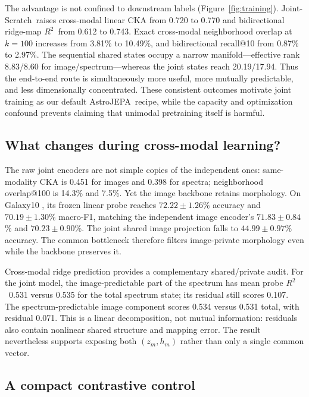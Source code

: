 \documentclass{article}
\newcommand{\method}{AstroJEPA}
\newcommand{\joint}{Joint-Scratch}
\newcommand{\rscore}{$R^2$}
\begin{document}
The advantage is not confined to downstream labels
(Figure~\ref{fig:training}).
\joint\ raises cross-modal linear CKA from 0.720 to 0.770 and bidirectional
ridge-map \rscore\ from 0.612 to 0.743.
Exact cross-modal neighborhood overlap at $k=100$ increases from 3.81\% to
10.49\%, and bidirectional recall@10 from 0.87\% to 2.97\%.
The sequential shared states occupy a narrow manifold---effective rank
8.83/8.60 for image/spectrum---whereas the joint states reach 20.19/17.94.
Thus the end-to-end route is simultaneously more useful, more mutually
predictable, and less dimensionally concentrated.
These consistent outcomes motivate joint training as our default \method\
recipe, while the capacity and optimization confound prevents claiming that
unimodal pretraining itself is harmful.

\subsection{What changes during cross-modal learning?}
\label{sec:change}

The raw joint encoders are not simple copies of the independent ones:
same-modality CKA is 0.451 for images and 0.398 for spectra; neighborhood
overlap@100 is 14.3\% and 7.5\%.
Yet the image backbone retains morphology.
On Galaxy10 \citep{leung2024galaxy10}, its frozen linear probe reaches
$72.22\pm1.26$\% accuracy and $70.19\pm1.30$\% macro-F1, matching the
independent image encoder's $71.83\pm0.84$\% and
$70.23\pm0.90$\%.
The joint shared image projection falls to
$44.99\pm0.97$\% accuracy.
The common bottleneck therefore filters image-private morphology even while
the backbone preserves it.

Cross-modal ridge prediction provides a complementary shared/private audit.
For the joint model, the image-predictable part of the spectrum has mean probe
\rscore\ 0.531 versus 0.535 for the total spectrum state; its residual still
scores 0.107.
The spectrum-predictable image component scores 0.534 versus 0.531 total,
with residual 0.071.
This is a linear decomposition, not mutual information: residuals also contain
nonlinear shared structure and mapping error.
The result nevertheless supports exposing both $(z_m,h_m)$ rather than only a
single common vector.

\subsection{A compact contrastive control}
\label{sec:clip}
\end{document}
